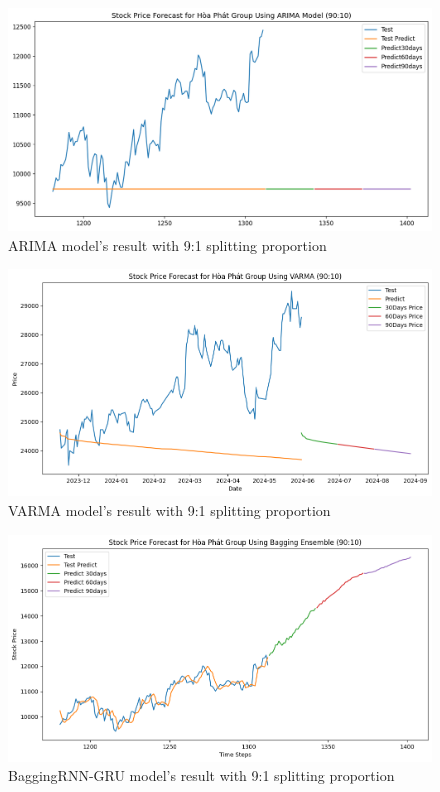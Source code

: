 \documentclass{ieeeojies}
\begin{document}
\begin{figure}[H]
  \centering
  \begin{minipage}{0.8\linewidth}
    \centering
    \includegraphics[width=\linewidth]{bibliography/ARIMA_HPG_90-10.png}
    \caption{ARIMA model's result with 9:1 splitting proportion}
    \label{fig9}
  \end{minipage}
\end{figure}
\begin{figure}[H]
  \centering
  \begin{minipage}{0.8\linewidth}
    \centering
    \includegraphics[width=\linewidth]{bibliography/VARMA_HPG_90-10.png}
    \caption{VARMA model's result with 9:1 splitting proportion}
    \label{fig10}
  \end{minipage}
\end{figure}
\begin{figure}[H]
  \centering
  \begin{minipage}{0.8\linewidth}
    \centering
    \includegraphics[width=\linewidth]{bibliography/Bagging_HPG.png}
    \caption{BaggingRNN-GRU model's result with 9:1 splitting proportion}
    \label{fig11}
  \end{minipage}
\end{figure}
\end{document}
